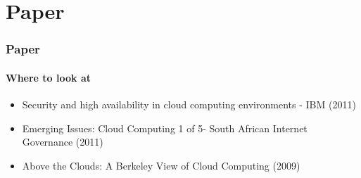 \documentclass[]{beamer}
\begin{document}
\section{Paper}

\begin{frame}
        \frametitle{Paper}
        \framesubtitle{Where to look at}
        \begin{itemize}
                \item Security and high availability in cloud computing
                environments - IBM (2011)
                \item Emerging Issues: Cloud Computing 1 of 5- South African Internet
                Governance (2011)
                \item Above the Clouds: A Berkeley View of Cloud Computing
                (2009)
        \end{itemize}
\end{frame}
\end{document}
